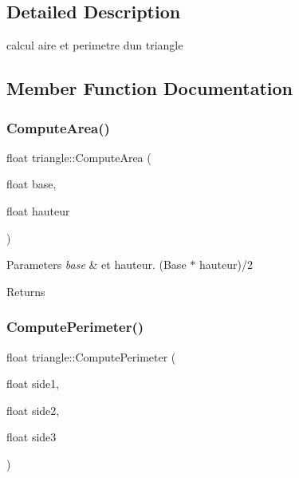 \subsection{Detailed Description}
calcul aire et perimetre d\textquotesingle{}un triangle 

\subsection{Member Function Documentation}
\mbox{\label{classtriangle_aff0e02134612db76cb599a0b85df566f}} 
\subsubsection{\texorpdfstring{Compute\+Area()}{ComputeArea()}}
{\footnotesize\ttfamily float triangle\+::\+Compute\+Area (\begin{DoxyParamCaption}\item[{float}]{base,  }\item[{float}]{hauteur }\end{DoxyParamCaption})}


\begin{DoxyParams}{Parameters}
{\em base} & et hauteur. (Base $\ast$ hauteur)/2 \\
\hline
\end{DoxyParams}
\begin{DoxyReturn}{Returns}

\end{DoxyReturn}
\mbox{\label{classtriangle_a6bd90bcfd3a2e287577fa7654ee7c8c2}} 
\subsubsection{\texorpdfstring{Compute\+Perimeter()}{ComputePerimeter()}}
{\footnotesize\ttfamily float triangle\+::\+Compute\+Perimeter (\begin{DoxyParamCaption}\item[{float}]{side1,  }\item[{float}]{side2,  }\item[{float}]{side3 }\end{DoxyParamCaption})}


